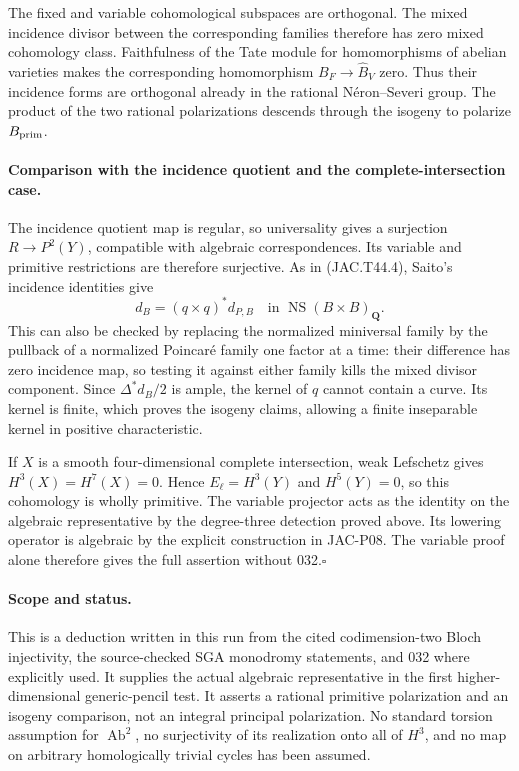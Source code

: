 \documentclass[11pt,a4paper]{article}
\begin{document}
The fixed and variable cohomological subspaces are orthogonal. The
mixed incidence divisor between the corresponding families therefore
has zero mixed cohomology class. Faithfulness of the Tate module for
homomorphisms of abelian varieties makes the corresponding homomorphism
$B_F\to\widehat B_V$ zero. Thus their incidence forms are orthogonal
already in the rational N\'eron--Severi group. The product of the two
rational polarizations descends through the isogeny to polarize
$B_{\rm prim}$.

\paragraph{Comparison with the incidence quotient and the complete-intersection case.}
The incidence quotient map is regular, so universality gives a
surjection $R\to P^2(Y)$, compatible with algebraic correspondences.
Its variable and primitive restrictions are therefore surjective.
As in (JAC.T44.4), Saito's incidence identities give
\[
 d_B=(q\times q)^*d_{P,B}
       \quad\text{in }\operatorname{NS}(B\times B)_{\mathbf Q}.
\]
This can also be checked by replacing the normalized miniversal family
by the pullback of a normalized Poincar\'e family one factor at a time:
their difference has zero incidence map, so testing it against either
family kills the mixed divisor component. Since $\Delta^*d_B/2$ is
ample, the kernel of $q$ cannot contain a curve. Its kernel is finite,
which proves the isogeny claims, allowing a finite inseparable kernel
in positive characteristic.

If $X$ is a smooth four-dimensional complete intersection, weak
Lefschetz gives $H^3(X)=H^7(X)=0$. Hence $E_\ell=H^3(Y)$ and
$H^5(Y)=0$, so this cohomology is wholly primitive. The variable
projector acts as the identity on the algebraic representative by the
degree-three detection proved above. Its lowering operator is algebraic
by the explicit construction in JAC-P08. The variable proof alone
therefore gives the full assertion without 032.\hfill$\square$

\paragraph{Scope and status.}
This is a deduction written in this run from the cited codimension-two
Bloch injectivity, the source-checked SGA monodromy statements, and 032
where explicitly used. It supplies the actual algebraic representative
in the first higher-dimensional generic-pencil test. It asserts a
rational primitive polarization and an isogeny comparison, not an
integral principal polarization. No standard torsion assumption for
$\operatorname{Ab}^2$, no surjectivity of its realization onto all of
$H^3$, and no map on arbitrary homologically trivial cycles has been
assumed.
\end{document}
